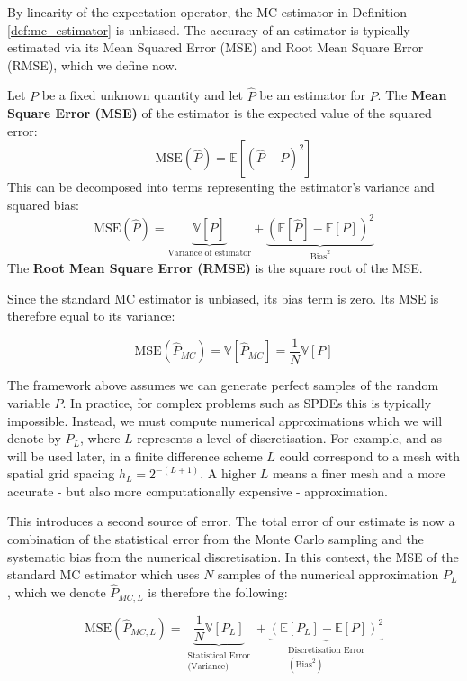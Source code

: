 By linearity of the expectation operator, the MC estimator in Definition \ref{def:mc_estimator} 
is unbiased. The accuracy of an estimator is typically estimated via its Mean Squared Error (MSE) and 
Root Mean Square Error (RMSE), which we define now.

\begin{definition}\label{def:mse_rmse}
    Let $P$ be a fixed unknown quantity and let $\hat{P}$ be an estimator for $P$. 
    The \textbf{Mean Square Error (MSE)} of the estimator is the expected value of 
    the squared error:
    \[
    \text{MSE}(\hat{P}) = \mathbb{E}[(\hat{P} - P)^2]
    \]
    This can be decomposed into terms representing the estimator's variance and squared bias:
    \[
    \text{MSE}(\hat{P}) = \underbrace{\mathbb{V}[\hat{P}]}_{\text{Variance of estimator}}
    + \underbrace{(\mathbb{E}[\hat{P}] - \mathbb{E}[P])^2}_{\text{Bias}^2}
    \]
    The \textbf{Root Mean Square Error (RMSE)} is the square root of the MSE.
\end{definition}

Since the standard MC estimator is unbiased, its bias term is zero. 
Its MSE is therefore equal to its variance:

\begin{equation*}
    \text{MSE}(\hat{P}_{MC}) = \mathbb{V}[\hat{P}_{MC}] = \frac{1}{N}\mathbb{V}[P]
\end{equation*}

The framework above assumes we can generate perfect samples of the random 
variable $P$. In practice, for complex problems such as SPDEs this is typically impossible.
Instead, we must compute numerical approximations which we will denote by $P_L$, where $L$ 
represents a level of discretisation. For example, and as will be used later,
in a finite difference scheme $L$ could correspond to a mesh with spatial grid spacing 
$h_L = 2^{-(L+1)}$. A higher $L$ means a finer mesh and a more accurate - but also more 
computationally expensive - approximation. 

This introduces a second source of error. The total error of our estimate is now a combination 
of the statistical error from the Monte Carlo sampling and the systematic bias from the
numerical discretisation. In this context, the MSE of the standard MC estimator which uses 
$N$ samples of the numerical approximation $P_L$, which we denote $\hat{P}_{MC, L}$ is therefore 
the following:

\begin{equation}
    \text{MSE}(\hat{P}_{MC,L}) = \underbrace{\frac{1}{N}\mathbb{V}[P_L]}_{\substack{\text{Statistical Error} \\ \text{(Variance)}}} + 
    \underbrace{(\mathbb{E}[P_L] - \mathbb{E}[P])^2}_{\substack{\text{Discretisation Error} \\ (\text{Bias}^2)}}
\end{equation}

